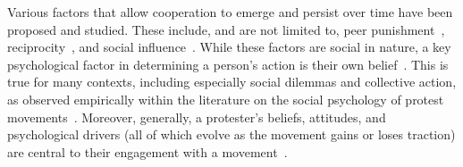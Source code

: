\documentclass[letterpaper, 10 pt, conference]{ieeeconf}  %
\begin{document}


Various factors that allow cooperation to emerge and persist over time have been proposed and studied. These include, and are not limited to, peer punishment~\cite{abbink_punish_2017}, reciprocity~\cite{gouldner_reciprocity_1960, park_opinions_2021}, and social influence~\cite{nowak_cooperation_2006}. While these factors are social in nature, a key psychological factor in determining a person's action is their own belief~\cite{henry2003beyond}. This is true for many contexts, including especially social dilemmas and collective action, as observed empirically within the literature on the social psychology of protest movements~\cite{thomas_protest_2024}. Moreover, generally, a protester's beliefs, attitudes, and psychological drivers (all of which evolve as the movement gains or loses traction) are central to their engagement with a movement~\cite{louis2022failure,nardini_BLM_2021}.
\end{document}

